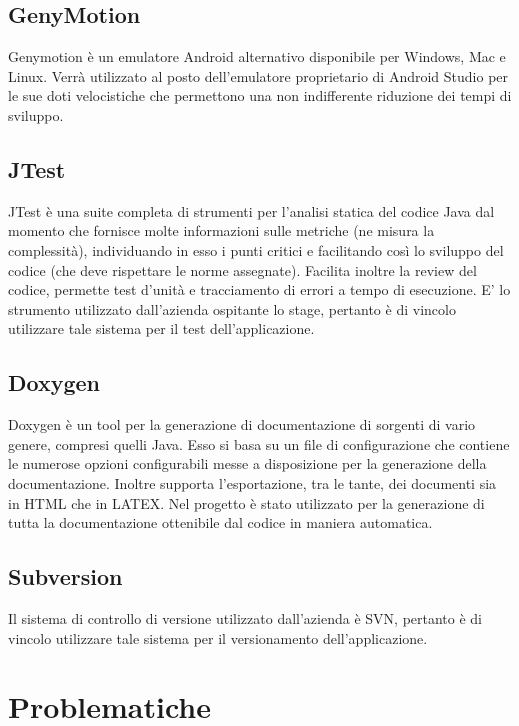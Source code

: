 \subsection{GenyMotion}

Genymotion è un emulatore Android alternativo disponibile per Windows, Mac e Linux. Verrà utilizzato al posto dell'emulatore proprietario di Android Studio per le sue doti velocistiche che permettono una non indifferente riduzione dei tempi di sviluppo.

\subsection{JTest}

JTest è una suite completa di strumenti per l'analisi statica del codice Java dal momento che fornisce molte informazioni sulle metriche (ne misura la complessità), individuando in esso i punti critici e facilitando così lo sviluppo del codice (che deve rispettare le norme assegnate). Facilita inoltre la review del codice, permette test d'unità e tracciamento di errori a tempo di esecuzione. E' lo strumento utilizzato dall'azienda ospitante lo stage, pertanto è di vincolo utilizzare tale sistema per il test dell'applicazione.


\subsection{Doxygen}

Doxygen è un tool per la generazione di documentazione di sorgenti di vario genere, compresi quelli Java. Esso si basa su un file di configurazione che contiene le numerose opzioni configurabili messe a disposizione per la generazione della documentazione. Inoltre supporta l'esportazione, tra le tante,
dei documenti sia in HTML che in LATEX. Nel progetto è stato utilizzato per la generazione di tutta la documentazione ottenibile dal codice in maniera automatica.

\subsection{Subversion}

Il sistema di controllo di versione utilizzato dall'azienda è SVN, pertanto è di vincolo utilizzare tale sistema per il versionamento dell'applicazione.


\newpage
\section{Problematiche}

